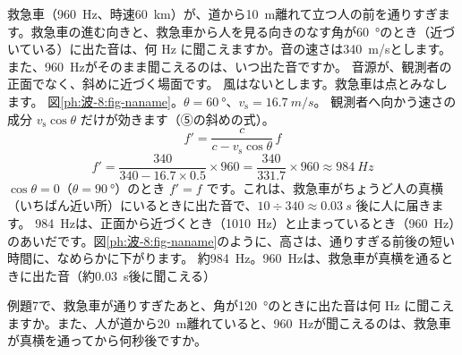 \label{ph:波-8:ex7}
\begin{phreidai}[斜めに通りすぎる救急車]
救急車（\qty{960}{Hz}、時速\qty{60}{km}）が、道から\qty{10}{m}離れて立つ人の前を通りすぎます。救急車の進む向きと、救急車から人を見る向きのなす角が\qty{60}{\degree}のとき（近づいている）に出た音は、何 Hz に聞こえますか。音の速さは\qty{340}{m/s}とします。また、\qty{960}{Hz}がそのまま聞こえるのは、いつ出た音ですか。
\phbamen
音源が、観測者の正面でなく、斜めに近づく場面です。
\phmushi
風はないとします。救急車は点とみなします。
\phzu
図\ref{ph:波-8:fig-naname}。$\theta=\qty{60}{\degree}$、$v_{\mathrm s}=\qty{16.7}{m/s}$。
\phriyu
観測者へ向かう速さの成分 $v_{\mathrm s}\cos\theta$ だけが効きます（⑤の斜めの式）。
\phtateru
\[f'=\frac{c}{c-v_{\mathrm s}\cos\theta}\,f\]
\phtoku
\[f'=\frac{340}{340-16.7\times0.5}\times960=\frac{340}{331.7}\times960\approx\qty{984}{Hz}\]
$\cos\theta=0$（$\theta=\qty{90}{\degree}$）のとき $f'=f$ です。これは、救急車がちょうど人の真横（いちばん近い所）にいるときに出た音で、$10\div340\approx\qty{0.03}{s}$ 後に人に届きます。
\phtashikame
\qty{984}{Hz}は、正面から近づくとき（\qty{1010}{Hz}）と止まっているとき（\qty{960}{Hz}）のあいだです。図\ref{ph:波-8:fig-naname}のように、高さは、通りすぎる前後の短い時間に、なめらかに下がります。
\kotae 約\qty{984}{Hz}。\qty{960}{Hz}は、救急車が真横を通るときに出た音（約\qty{0.03}{s}後に聞こえる）
\end{phreidai}
\begin{jibun}
例題7で、救急車が通りすぎたあと、角が\qty{120}{\degree}のときに出た音は何 Hz に聞こえますか。また、人が道から\qty{20}{m}離れていると、\qty{960}{Hz}が聞こえるのは、救急車が真横を通ってから何秒後ですか。
\end{jibun}

